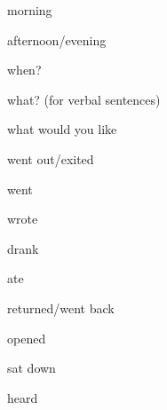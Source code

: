 \documentclass[avery5371,grid,frame]{flashcards}
\begin{document}
\begin{flashcard}{\LARGE morning}
\LARGE {}
\end{flashcard}
\begin{flashcard}{\LARGE afternoon/evening}
\LARGE {}
\end{flashcard}
\begin{flashcard}{\LARGE when?}
\LARGE {}
\end{flashcard}
\begin{flashcard}{\LARGE what? (for verbal sentences)}
\LARGE {}
\end{flashcard}
\begin{flashcard}{\LARGE what would you like}
\LARGE {}
\end{flashcard}
\begin{flashcard}{\LARGE went out/exited}
\LARGE {}
\end{flashcard}
\begin{flashcard}{\LARGE went}
\LARGE {}
\end{flashcard}
\begin{flashcard}{\LARGE wrote}
\LARGE {}
\end{flashcard}
\begin{flashcard}{\LARGE drank}
\LARGE {}
\end{flashcard}
\begin{flashcard}{\LARGE ate}
\LARGE {}
\end{flashcard}
\begin{flashcard}{\LARGE returned/went back}
\LARGE {}
\end{flashcard}
\begin{flashcard}{\LARGE opened}
\LARGE {}
\end{flashcard}
\begin{flashcard}{\LARGE sat down}
\LARGE {}
\end{flashcard}
\begin{flashcard}{\LARGE heard}
\LARGE {}
\end{flashcard}
\end{document}
